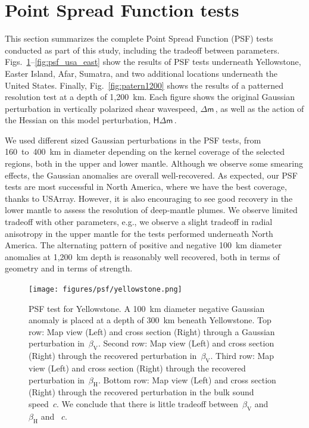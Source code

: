 \documentclass[extra,mreferee]{gji}
\begin{document}

\section{Point Spread Function tests}

This section summarizes the complete Point Spread Function (PSF) tests conducted as part of this study, including the tradeoff between parameters.
Figs.~\ref{fig:psf_yellowstone}--\ref{fig:psf_usa_east} show the results of PSF tests underneath Yellowstone, Easter Island, Afar, Sumatra, and two additional locations underneath the United States.
Finally, Fig.~\ref{fig:patern1200} shows the results of a patterned resolution test at a depth of 1,200~km.
Each figure shows the original Gaussian perturbation in vertically polarized shear wavespeed, $\mathsf{\Delta}\mathsf{m}$\,, as well as the action of the Hessian on this model perturbation, $\mathsf{H}\mathsf{\Delta}\mathsf{m}$\,.

We used different sized Gaussian perturbations in the PSF tests, from 160~to~400~km in diameter depending on the kernel coverage of the selected regions, both in the upper and lower mantle.
Although we observe some smearing effects, the Gaussian anomalies are overall well-recovered.
As expected, our PSF tests are most successful in North America, where we have the best coverage, thanks to USArray.
However, it is also encouraging to see good recovery in the lower mantle to assess the resolution of deep-mantle plumes.
We observe limited tradeoff with other parameters, e.g., we observe a slight tradeoff in radial anisotropy in the upper mantle for the tests performed underneath North America.
The alternating pattern of positive and negative 100~km diameter anomalies at 1,200~km depth is reasonably well recovered, both in terms of geometry and in terms of strength.

\begin{figure}
  \centering
  \texttt{[image: figures/psf/yellowstone.png]}
  \caption{\small{PSF test for Yellowstone.
  A 100~km diameter negative Gaussian anomaly is placed at a depth of 300~km beneath Yellowstone.
  Top row: Map view (Left) and cross section (Right) through a Gaussian perturbation in~$\beta_\mathrm{V}$.
  Second row: Map view (Left) and cross section (Right) through the recovered perturbation in~$\beta_\mathrm{V}$.
  Third row: Map view (Left) and cross section (Right) through the recovered perturbation in~$\beta_\mathrm{H}$.
  Bottom row: Map view (Left) and cross section (Right) through the recovered perturbation in the bulk sound speed~$c$. We conclude that there is little tradeoff between~$\beta_\mathrm{V}$ and~$\beta_\mathrm{H}$ and ~$c$.
  }}
  \label{fig:psf_yellowstone}
\end{figure}
\end{document}
